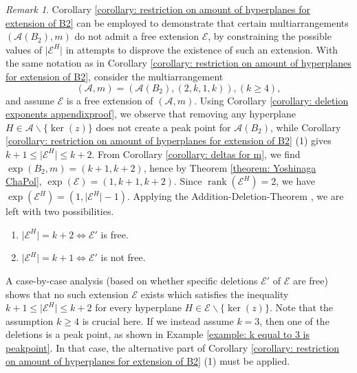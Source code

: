 \documentclass[12pt]{amsart}
\theoremstyle{definition}
\theoremstyle{remark}
\newtheorem{remark}[theorem]{Remark}
\newcommand{\rank}{\operatorname{rank}}
\newcommand\CA{{\mathscr A}}
\newcommand\CE{{\mathscr E}}
\begin{document}
\begin{remark}\label{remark: using corollary for nonfreeness}
Corollary \ref{corollary: restriction on amount of hyperplanes for extension of B2} can be employed to demonstrate that certain multiarrangements $(\CA(B_2),m)$ do not admit a free extension $\CE$, by constraining the possible values of $\vert\CE^H\vert$ in attempts to disprove the existence of such an extension. With the same notation as in Corollary \ref{corollary: restriction on amount of hyperplanes for extension of B2}, consider the multiarrangement $$(\CA,m)=(\CA(B_2),(2,k,1,k)), (k\geq 4),$$ and assume $\CE$ is a free extension of $(\CA,m)$. Using Corollary \ref{corollary: deletion exponents appendixproof}, we observe that removing any hyperplane $H\in\CA\backslash\{\ker(z)\}$ does not create a peak point for $\CA(B_2)$, while Corollary \ref{corollary: restriction on amount of hyperplanes for extension of B2} (1) gives $k+1\leq\vert\CE^H\vert\leq k+2$. From Corollary \ref{corollary: deltas for m}, we find $\exp(B_2,m)=(k+1,k+2)$, hence by Theorem \ref{theorem: Yoshinaga ChaPol}, $\exp(\CE)=(1,k+1,k+2)$. Since $\rank(\CE^H)=2$, we have $\exp(\CE^H)=(1,\vert\CE^H\vert-1)$. Applying the Addition-Deletion-Theorem \cite{Add-Del-Terao}, we are left with two possibilities.
\begin{enumerate}
        \item $\vert\CE^H\vert= k+2\iff \CE'$ is free.
        \item $\vert\CE^H\vert= k+1\iff \CE'$ is not free.
    \end{enumerate}
    A case-by-case analysis (based on whether specific deletions $\CE'$ of $\CE$ are free) shows that no such extension $\CE$ exists which satisfies the inequality $k+1\leq\vert\CE^H\vert\leq k+2$ for every hyperplane $H\in\CE\backslash\{\ker(z)\}$. Note that the assumption $k\geq 4$ is crucial here. If we instead assume $k=3$, then one of the deletions is a peak point, as shown in Example \ref{example: k equal to 3 is peakpoint}. In that case, the alternative part of Corollary \ref{corollary: restriction on amount of hyperplanes for extension of B2} (1) must be applied.
\end{remark}
\end{document}
